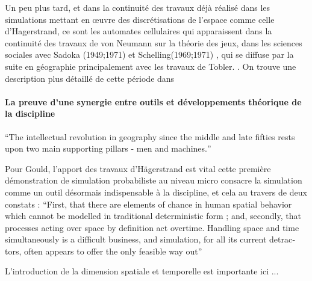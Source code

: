 Un peu plus tard, et dans la continuité des travaux déjà réalisé dans les simulations mettant en œuvre des discrétisations de l'espace comme celle d'Hagerstrand, ce sont les automates cellulaires qui apparaissent dans la continuité des travaux de von Neumann sur la théorie des jeux, dans les sciences sociales avec Sadoka (1949;1971) et Schelling(1969;1971) \autocite{Ganguly2003}, qui se diffuse par la suite en géographie principalement avec les travaux de Tobler. \autocite{Tobler1970b} \autocite{Tobler1979}. On trouve une description plus détaillé de cette période dans \autocite{Louail2010}

\paragraph{La preuve d'une synergie entre outils et développements théorique de la discipline}

\foreignquote{english}{The intellectual revolution in geography since the middle and late fifties rests upon two main supporting pillars - men and machines.}

Pour Gould, l'apport des travaux d'Hägerstrand est vital cette première démonstration de simulation probabiliste au niveau micro consacre la simulation comme un outil désormais indispensable à la discipline, et cela au travers de deux constats : \foreignquote{english}{First, that there are elements of chance in human spatial behavior which cannot be modelled in traditional deterministic form ; and, secondly, that processes acting over space by definition act overtime. Handling space and time simultaneously is a difficult business, and simulation, for all its current detractors, often appears to offer the only feasible way out} \autocite{Gould1970}

L'introduction de la dimension spatiale et temporelle est importante ici ... 




